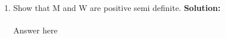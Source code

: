 \documentclass{article}
\numberwithin{equation}{section}
\newcommand{\0}{\mathbf{0}}
\begin{document}
\begin{enumerate}
\begin{enumerate}
		\item Show that M and W are positive semi definite.
 		\textbf{Solution:}
		\\
		\\
		Answer here
		\\
		\\		
		
 		\end{enumerate}
	 	
	 \end{enumerate}


			
\end{document}
